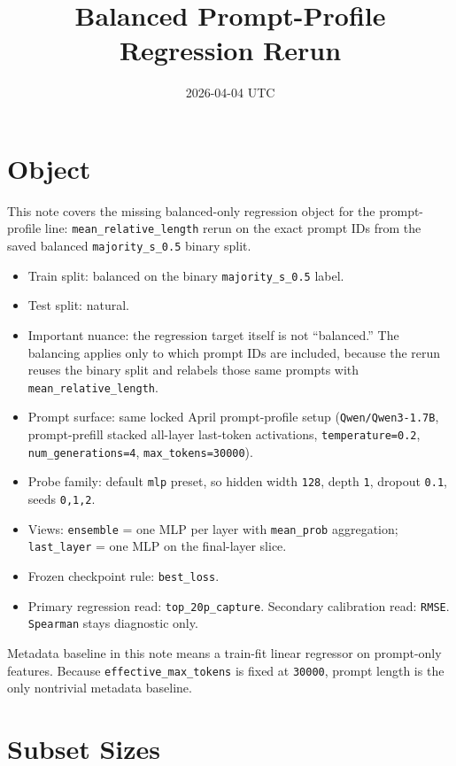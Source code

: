 \documentclass[11pt]{article}
\title{Balanced Prompt-Profile Regression Rerun}
\author{}
\date{2026-04-04 UTC}
\begin{document}
\maketitle

\section{Object}

This note covers the missing balanced-only regression object for the prompt-profile line:
\texttt{mean\_relative\_length} rerun on the exact prompt IDs from the saved balanced
\texttt{majority\_s\_0.5} binary split.

\begin{itemize}
\item Train split: balanced on the binary \texttt{majority\_s\_0.5} label.
\item Test split: natural.
\item Important nuance: the regression target itself is not ``balanced.'' The balancing applies only to which prompt IDs are included, because the rerun reuses the binary split and relabels those same prompts with \texttt{mean\_relative\_length}.
\item Prompt surface: same locked April prompt-profile setup (\texttt{Qwen/Qwen3-1.7B}, prompt-prefill stacked all-layer last-token activations, \texttt{temperature=0.2}, \texttt{num\_generations=4}, \texttt{max\_tokens=30000}).
\item Probe family: default \texttt{mlp} preset, so hidden width \texttt{128}, depth \texttt{1}, dropout \texttt{0.1}, seeds \texttt{0,1,2}.
\item Views: \texttt{ensemble} = one MLP per layer with \texttt{mean\_prob} aggregation; \texttt{last\_layer} = one MLP on the final-layer slice.
\item Frozen checkpoint rule: \texttt{best\_loss}.
\item Primary regression read: \texttt{top\_20p\_capture}. Secondary calibration read: \texttt{RMSE}. \texttt{Spearman} stays diagnostic only.
\end{itemize}

Metadata baseline in this note means a train-fit linear regressor on prompt-only features.
Because \texttt{effective\_max\_tokens} is fixed at \texttt{30000}, prompt length is the only
nontrivial metadata baseline.

\section{Subset Sizes}
\end{document}
